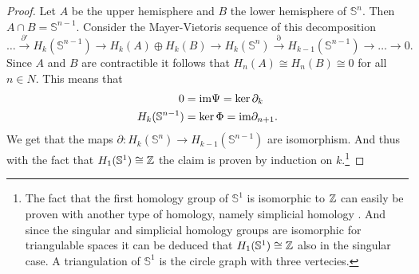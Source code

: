\begin{proof}
  Let $A$ be the upper hemisphere and $B$ the lower hemisphere of $\mathbb{S}^n$. Then $A\cap B = \mathbb{S}^{n-1}$. Consider the Mayer-Vietoris sequence of this decomposition
  \begin{equation*}
    \ldots \overset{\partial'}{\to} H_k(\mathbb{S}^{n-1}) \to H_k(A) \oplus H_k(B) \to H_k(\mathbb{S}^n) \overset{\partial}{\to} H_{k-1}(\mathbb{S}^{n-1}) \to \ldots \to 0.
  \end{equation*}
  Since $A$ and $B$ are contractible it follows that $H_n(A) \cong H_n(B) \cong 0$ for all $n \in N$. This means that
  \begin{align*}
    0 &= {\rm im} \Psi = \ker \partial_k \\
    H_k(\mathbb{S}^{n-1}) &= \ker \Phi = {\rm im} \partial_{n+1}.
  \end{align*}
  We get that the maps $\partial\colon H_k(\mathbb{S}^n) \to H_{k-1}(\mathbb{S}^{n-1})$ are isomorphism. And thus with the fact that $H_1(\mathbb{S}^1) \cong \mathbb{Z}$ the claim is proven by induction on $k$.\footnote{The fact that the first homology group of $\mathbb{S}^1$ is isomorphic to $\mathbb{Z}$ can easily be proven with another type of homology, namely simplicial homology \cite[p. 106]{hatcher}. And since the singular and simplicial homology groups are isomorphic for triangulable spaces it can be deduced that $H_1(\mathbb{S}^1) \cong \mathbb{Z}$ also in the singular case. A triangulation of $\mathbb{S}^1$ is the circle graph with three vertecies.}
\end{proof}
